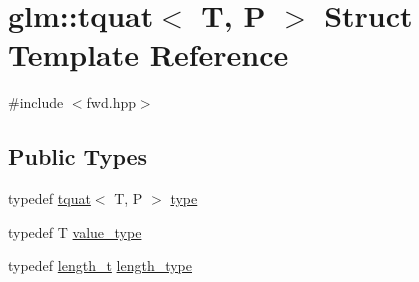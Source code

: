 \hypertarget{structglm_1_1tquat}{}\section{glm\+::tquat$<$ T, P $>$ Struct Template Reference}
\label{structglm_1_1tquat}


{\ttfamily \#include $<$fwd.\+hpp$>$}

\subsection*{Public Types}
\begin{DoxyCompactItemize}
\item 
typedef \mbox{\hyperlink{structglm_1_1tquat}{tquat}}$<$ T, P $>$ \mbox{\hyperlink{structglm_1_1tquat_a5a7bf29e6af38b1b79e9f553fd85f3ec}{type}}
\item 
typedef T \mbox{\hyperlink{structglm_1_1tquat_ab335d431872cb11fb3b5e2476adc32d8}{value\+\_\+type}}
\item 
typedef \mbox{\hyperlink{namespaceglm_a090a0de2260835bee80e71a702492ed9}{length\+\_\+t}} \mbox{\hyperlink{structglm_1_1tquat_ab3ef67a20d129dcb01f042042218ba17}{length\+\_\+type}}
\end{DoxyCompactItemize}
